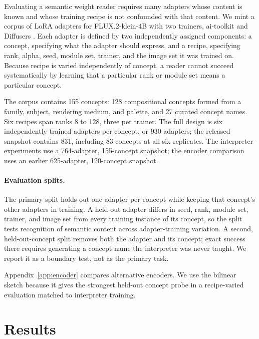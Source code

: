 \documentclass{article}
\begin{document}
Evaluating a semantic weight reader requires many adapters whose content is known and whose training
recipe is not confounded with that content. We mint a corpus of LoRA adapters for FLUX.2-klein-4B
\citep{bfl2026flux2klein} with two trainers, ai-toolkit \citep{ostris2026aitoolkit} and Diffusers
\citep{vonplaten2022diffusers}. Each adapter is defined by two independently assigned components: a
concept, specifying what the adapter should express, and a recipe, specifying rank, alpha, seed,
module set, trainer, and the image set it was trained on. Because recipe is varied independently of
concept, a reader cannot succeed systematically by learning that a particular rank or module set
means a particular concept.

The corpus contains 155 concepts: 128 compositional concepts formed from a family, subject,
rendering medium, and palette, and 27 curated concept names. Six recipes span ranks 8 to 128, three
per trainer. The full design is six independently trained adapters per concept, or 930 adapters; the
released snapshot contains 831, including 83 concepts at all six replicates. The interpreter
experiments use a 764-adapter, 155-concept snapshot; the encoder comparison uses an earlier
625-adapter, 120-concept snapshot.

\paragraph{Evaluation splits.}
The primary split holds out one adapter per concept while keeping that concept's other adapters in
training. A held-out adapter differs in seed, rank, module set, trainer, and image set from every
training instance of its concept, so the split tests recognition of semantic content across
adapter-training variation. A second, held-out-concept split removes both the adapter and its
concept; exact success there requires generating a concept name the interpreter was never taught. We
report it as a boundary test, not as the primary task.

Appendix~\ref{app:encoder} compares alternative encoders. We use the bilinear sketch because it
gives the strongest held-out concept probe in a recipe-varied evaluation matched to interpreter
training.

\section{Results}
\label{sec:results}
\end{document}
